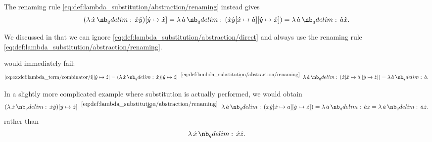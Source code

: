 \begin{example}
\begin{thmenum}
    The renaming rule \eqref{eq:def:lambda_substitution/abstraction/renaming} instead gives
    \begin{equation*}
      (\qabs \synx \synx \syny)[\syny \mapsto \synx] = \qabs \syna (\synx \syny[\synx \mapsto \syna][\syny \mapsto \synx]) = \qabs \syna \syna \synx.
    \end{equation*}

     We discussed in  that we can ignore \eqref{eq:def:lambda_substitution/abstraction/direct} and always use the renaming rule \eqref{eq:def:lambda_substitution/abstraction/renaming}.

     would immediately fail:
    \begin{equation*}
      \ref{eq:ex:def:lambda_term/combinator/i}[\syny \mapsto \synz]
      =
      (\qabs \synx \synx)[\syny \mapsto \synz]
      \reloset {\eqref{eq:def:lambda_substitution/abstraction/renaming}} =
      \qabs \syna (\synx[\synx \mapsto \syna][\syny \mapsto \synz])
      =
      \qabs \syna \syna.
    \end{equation*}

    In a slightly more complicated example where substitution is actually performed, we would obtain
    \begin{equation*}
      (\qabs \synx \synx \syny)[\syny \mapsto \synz]
      \reloset {\eqref{eq:def:lambda_substitution/abstraction/renaming}} =
      \qabs \syna (\synx \syny[\synx \mapsto a][\syny \mapsto \synz])
      =
      \qabs \syna \syna \synz
      =
      \qabs \syna \syna \synz.
    \end{equation*}
    rather than
    \begin{equation*}
      \qabs \synx \synx \synz.
    \end{equation*}
  \end{thmenum}
\end{example}

